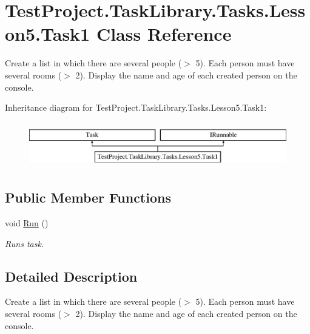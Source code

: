 \hypertarget{class_test_project_1_1_task_library_1_1_tasks_1_1_lesson5_1_1_task1}{}\section{Test\+Project.\+Task\+Library.\+Tasks.\+Lesson5.\+Task1 Class Reference}
\label{class_test_project_1_1_task_library_1_1_tasks_1_1_lesson5_1_1_task1}


Create a list in which there are several people ($>$ 5). Each person must have several rooms ($>$ 2). Display the name and age of each created person on the console.  


Inheritance diagram for Test\+Project.\+Task\+Library.\+Tasks.\+Lesson5.\+Task1\+:\begin{figure}[H]
\begin{center}
\leavevmode
\includegraphics[height=2.000000cm]{class_test_project_1_1_task_library_1_1_tasks_1_1_lesson5_1_1_task1}
\end{center}
\end{figure}
\subsection*{Public Member Functions}
\begin{DoxyCompactItemize}
\item 
void \mbox{\hyperlink{class_test_project_1_1_task_library_1_1_tasks_1_1_lesson5_1_1_task1_aeb5f2643ee2d4b8cccdabb332a3ceec1}{Run}} ()
\begin{DoxyCompactList}\small\item\em Runs task. \end{DoxyCompactList}\end{DoxyCompactItemize}


\subsection{Detailed Description}
Create a list in which there are several people ($>$ 5). Each person must have several rooms ($>$ 2). Display the name and age of each created person on the console. 



